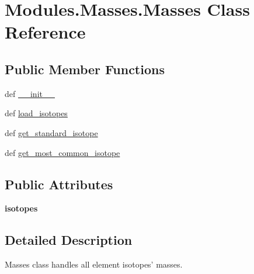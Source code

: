 \hypertarget{classModules_1_1Masses_1_1Masses}{\section{Modules.\-Masses.\-Masses Class Reference}
\label{classModules_1_1Masses_1_1Masses}
}
\subsection*{Public Member Functions}
\begin{DoxyCompactItemize}
\item 
def \hyperlink{classModules_1_1Masses_1_1Masses_afb809f124e98c55c35727b727f4f76b0}{\-\_\-\-\_\-init\-\_\-\-\_\-}
\item 
def \hyperlink{classModules_1_1Masses_1_1Masses_accc7207904ee21f66984be035036a338}{load\-\_\-isotopes}
\item 
def \hyperlink{classModules_1_1Masses_1_1Masses_a0e3a431a9468d36270a460cb1c634a5f}{get\-\_\-standard\-\_\-isotope}
\item 
def \hyperlink{classModules_1_1Masses_1_1Masses_a8ee3f00a468b3f7c3e48cfdf8b700904}{get\-\_\-most\-\_\-common\-\_\-isotope}
\end{DoxyCompactItemize}
\subsection*{Public Attributes}
\begin{DoxyCompactItemize}
\item 
\hypertarget{classModules_1_1Masses_1_1Masses_a3292673036162443cfcf8df277ea46ce}{{\bfseries isotopes}}\label{classModules_1_1Masses_1_1Masses_a3292673036162443cfcf8df277ea46ce}

\end{DoxyCompactItemize}


\subsection{Detailed Description}
\begin{DoxyVerb}Masses class handles all element isotopes' masses.
\end{DoxyVerb}
 

